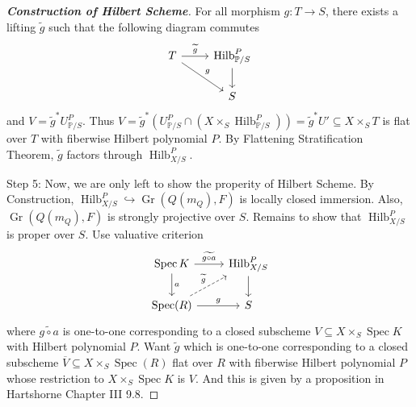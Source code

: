 \documentclass{ctexart}
\newcommand{\spec}{\operatorname{Spec}}
\newcommand{\grassmannianscheme}[2]{\operatorname{Gr}(#1, #2)}
\newcommand{\hilbertscheme}{\operatorname{Hilb}}
\begin{document}
\begin{proof}[\textbf{\emph{Construction of Hilbert Scheme}}]
    For all morphism $g: T \longrightarrow S$, there exists a lifting $\widetilde{g}$ such that the following diagram commutes
    \begin{equation*}
        \begin{tikzcd}
            T \arrow[r, "\widetilde{g}"] \arrow[dr, "g"] &
            \hilbertscheme_{\mathbb{P}/S}^{P} \arrow[d] \\
            & S
        \end{tikzcd}
    \end{equation*}
    and $V = \widetilde{g}^{\ast}U_{\mathbb{P}/S}^{P}$.
    Thus $V = \widetilde{g}^{\ast}(U_{\mathbb{P}/S}^{P} \cap (X \times_{S} \hilbertscheme_{\mathbb{P}/S}^{P})) = \widetilde{g}^{\ast}U' \subseteq X \times_{S} T$ is flat over $T$ with fiberwise Hilbert polynomial $P$.
    By Flattening Stratification Theorem, $\widetilde{g}$ factors through $\hilbertscheme_{X/S}^{P}$.
    \par
    Step 5:
    Now, we are only left to show the properity of Hilbert Scheme.
    By Construction, $\hilbertscheme_{X/S}^{P} \hookrightarrow \grassmannianscheme{Q(m_{Q})}{F}$ is locally closed immersion.
    Also, $\grassmannianscheme{Q(m_{Q})}{F}$ is strongly projective over $S$.
    Remains to show that $\hilbertscheme_{X/S}^{P}$ is proper over $S$.
    Use valuative criterion
    \begin{equation*}
        \begin{tikzcd}
            \spec K \arrow[r, "\widetilde{g \circ a}"] \arrow[d, "a"] &
            \hilbertscheme_{X/S}^{P} \arrow[d] \\
            \spec(R) \arrow[ur, dashrightarrow, "\widetilde{g}"] \arrow[r, "g"] &
            S 
        \end{tikzcd}
    \end{equation*}
    where $\widetilde{g \circ a}$ is one-to-one corresponding to a closed subscheme $V \subseteq X \times_{S} \spec K$ with Hilbert polynomial $P$.
    Want $\widetilde{g}$ which is one-to-one corresponding to a closed subscheme $\overline{V} \subseteq X \times_{S} \spec(R)$ flat over $R$ with fiberwise Hilbert polynomial $P$ whose restriction to $X \times_{S} \spec K$ is $V$.
    And this is given by a proposition in Hartshorne Chapter III 9.8.
\end{proof}
\end{document}
